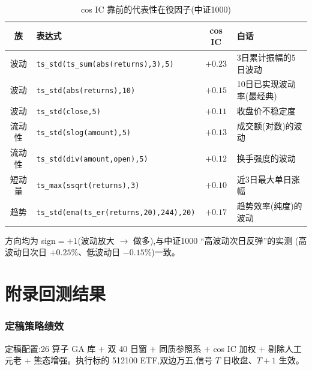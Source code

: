 \documentclass[11pt,a4paper,fontset=mac]{ctexart}
\begin{document}
\begin{table}[htbp]\centering
\caption{cos IC 靠前的代表性在役因子(中证1000)}\label{tab:factors}
\small\begin{threeparttable}
\begin{tabular}{clcl}
\toprule
族 & 表达式 & cos IC & 白话 \\
\midrule
波动 & \texttt{ts\_std(ts\_sum(abs(returns),3),5)} & $+0.23$ & 3日累计振幅的5日波动 \\
波动 & \texttt{ts\_std(abs(returns),10)}          & $+0.15$ & 10日已实现波动率(最经典) \\
波动 & \texttt{ts\_std(close,5)}                   & $+0.11$ & 收盘价不稳定度 \\
流动性& \texttt{ts\_std(slog(amount),5)}           & $+0.13$ & 成交额(对数)的波动 \\
流动性& \texttt{ts\_std(div(amount,open),5)}       & $+0.12$ & 换手强度的波动 \\
短动量& \texttt{ts\_max(ssqrt(returns),3)}         & $+0.10$ & 近3日最大单日涨幅 \\
趋势 & \texttt{ts\_std(ema(ts\_er(returns,20),244),20)} & $+0.17$ & 趋势效率(纯度)的波动 \\
\bottomrule
\end{tabular}
\begin{tablenotes}\scriptsize
\item 方向均为 sign$=+1$(波动放大 $\to$ 做多),与中证1000 ``高波动次日反弹''的实测
(高波动日次日 $+0.25\%$、低波动日 $-0.15\%$)一致。
\end{tablenotes}\end{threeparttable}
\end{table}

\appendix
\part*{附录\quad 回测结果}

\section{定稿策略绩效}
定稿配置:26 算子 GA 库 $+$ 双 40 日窗 $+$ 同质参照系 $+$ cos IC 加权 $+$ 剔除人工元老
$+$ 熊态增强。执行标的 512100 ETF,双边万五,信号 $T$ 日收盘、$T{+}1$ 生效。
\end{document}
